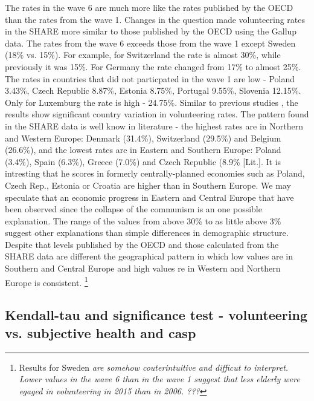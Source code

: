 \documentclass[10pt, letterpaper]{article}
\begin{document}
\begin{spacing}{1.4}
\begin{spacing}{.9}
	 
      \label{OECDSHARE} 
\end{spacing}

The rates in the wave 6 are much more like the rates published by the OECD than the rates from the wave 1. Changes in the question made volunteering rates in the SHARE more similar to those published by the OECD using the Gallup data. The rates from the wave 6 exceeds those from the wave 1 except Sweden (18\% vs. 15\%).  For example, for Switzerland the rate is almost 30\%, while previously it was 15\%. For Germany the rate changed from 17\% to almost 25\%. The rates in countries that did not particpated in the wave 1 are low - Poland 3.43\%, Czech Republic 8.87\%, Estonia 8.75\%, Portugal 9.55\%, Slovenia 12.15\%. Only for Luxemburg the rate is high - 24.75\%. Similar to previous studies , the results show significant country variation in volunteering rates. The pattern found in the SHARE data is well know in literature - the highest rates are in Northern and Western Europe:  Denmark (31.4\%), Switzerland (29.5\%) and Belgium (26.6\%), and the lowest rates are in Eastern and Southern Europe: Poland (3.4\%), Spain (6.3\%), Greece (7.0\%) and Czech Republic (8.9\% [Lit.]. It is intresting that he scores in formerly centrally-planned economies such as Poland, Czech Rep., Estonia or Croatia are higher than in Southern Europe. We may speculate that an economic progress in Eastern and Central Europe that have been observed since the collapse of the communism is an one possible explanation. The range of the values from above 30\% to as little above 3\% suggest other explanations than simple differences in demographic structure.   Despite that levels published by the OECD and those calculated from the SHARE data are different the geographical pattern in which low values are in Southern and Central Europe and high values re in  Western and Northern Europe is consistent. \footnote{Results for Sweden \textit{are somehow couterintuitive and difficut to interpret. Lower values in the wave 6 than in the wave 1 suggest that less elderly were egaged in volunteering in 2015 than in 2006. ??? }} \\



\subsection*{Kendall-tau and significance test - volunteering vs. subjective health and casp}


\end{spacing}
\end{document}
